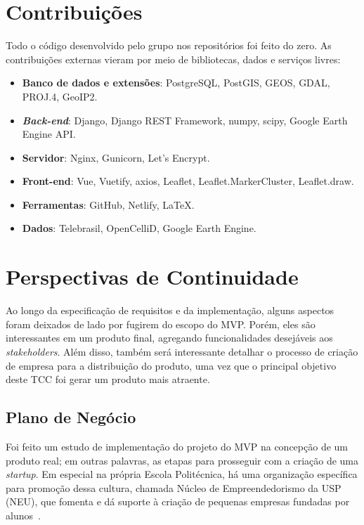 \documentclass[]{politex}
\begin{document}
\section{Contribuições}

Todo o código desenvolvido pelo grupo nos repositórios foi feito do zero. As
contribuições externas vieram por meio de bibliotecas, dados e serviços livres:

\begin{itemize}
\item \textbf{Banco de dados e extensões}: PostgreSQL, PostGIS, GEOS, GDAL,
PROJ.4, GeoIP2.
\item \textbf{\textit{Back-end}}: Django, Django REST Framework, numpy, scipy,
Google Earth Engine API.
\item \textbf{Servidor}: Nginx, Gunicorn, Let's Encrypt.
\item \textbf{Front-end}: Vue, Vuetify, axios, Leaflet, Leaflet.MarkerCluster,
Leaflet.draw.
\item \textbf{Ferramentas}: GitHub, Netlify, LaTeX.
\item \textbf{Dados}: Telebrasil, OpenCelliD, Google Earth Engine.
\end{itemize}

\section{Perspectivas de Continuidade}

Ao longo da especificação de requisitos e da implementação, alguns aspectos
foram deixados de lado por fugirem do escopo do MVP. Porém, eles são
interessantes em um produto final, agregando funcionalidades desejáveis aos
\textit{stakeholders}. Além disso, também será interessante detalhar o processo
de criação de empresa para a distribuição do produto, uma vez que o principal
objetivo deste TCC foi gerar um produto mais atraente.

\subsection{Plano de Negócio}

Foi feito um estudo de implementação do projeto do MVP na concepção de um
produto real; em outras palavras, as etapas para prosseguir com a criação de uma
\textit{startup}. Em especial na própria Escola Politécnica, há uma organização
específica para promoção dessa cultura, chamada Núcleo de Empreendedorismo da
USP (NEU), que fomenta e dá suporte à criação de pequenas empresas fundadas por
alunos~\cite{neu}.
\end{document}
